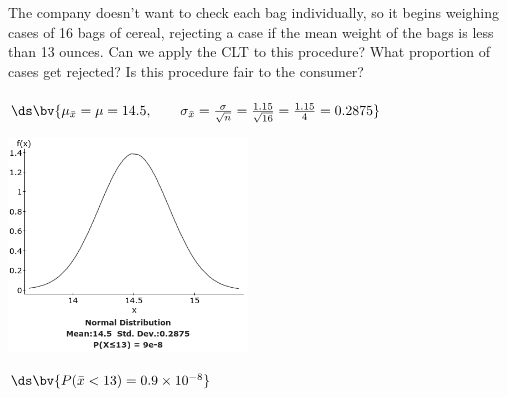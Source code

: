 \documentclass{article}
\begin{document}
\begin{flushleft}
\begin{enumalpha}
\item The company doesn't want to check each bag individually, so it begins weighing cases of 16 bags of cereal, rejecting a case if the mean weight of the bags is less than 13 ounces. Can we apply the CLT to this procedure? What proportion of cases get rejected? Is this procedure fair to the consumer?\\
\medskip
{}\\
\medskip
$\ds\bv{\mu_{\bar x} = \mu = 14.5, \qquad \sigma_{\bar x} = \frac{\sigma}{\sqrt n} = \frac {1.15}{\sqrt{16}} = \frac {1.15}4 = 0.2875}$\\
\smallskip
{\centering
\includegraphics[width=2.5in]{images/grp06_Q2_b}
\par}
$\ds\bv{P(\bar x < 13) = 0.9 \times 10^{-8}}$\\
\medskip
{}

\end{enumalpha}

\newpage

\end{flushleft}
\end{document}
